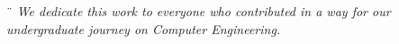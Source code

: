 \begin{dedicatory}
   \vspace*{\fill}
       \centering
       ¨%
       \textit{ We dedicate this work to everyone who contributed in a way for our undergraduate journey on Computer Engineering.
       } 
   \vspace*{\fill}
   
\end{dedicatory}
